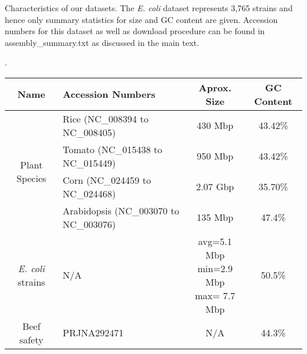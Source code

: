 

    \begin{mytable}
       \caption{Characteristics of our datasets.  The \emph{E. coli} dataset represents 3,765 strains and hence only summary statistics for size and GC content are given. Accession numbers for this dataset as well as download procedure can be found in assembly\_summary.txt as discussed in the main text.}.
  \label{tbl-datasets}
      \small
   \centering
   \begin{tabular}{clcc}
     \toprule
     {\bf Name} &  {\bf Accession Numbers} & {\bf Aprox. Size} & {\bf GC Content} \\

     \midrule
     
     \multirow{4}{*}{Plant Species }
     & Rice  (NC\_008394 to NC\_008405) & 430 Mbp & 43.42\% \\
     & Tomato  (NC\_015438 to NC\_015449) &  950 Mbp & 43.42\% \\
     & Corn  (NC\_024459 to NC\_024468) & 2.07 Gbp & 35.70\% \\
     & Arabidopsis  (NC\_003070 to NC\_003076) & 135 Mbp & 47.4\% \\
     \midrule

     \emph{E. coli} strains &  N/A & \pbox{3cm}{avg=5.1 Mbp\\ min=2.9 Mbp\\ max= 7.7 Mbp} & 50.5\% \\

     \midrule

     Beef safety &  PRJNA292471 & N/A & 44.3\% \\
     \bottomrule
   \end{tabular}
   \end{mytable}



